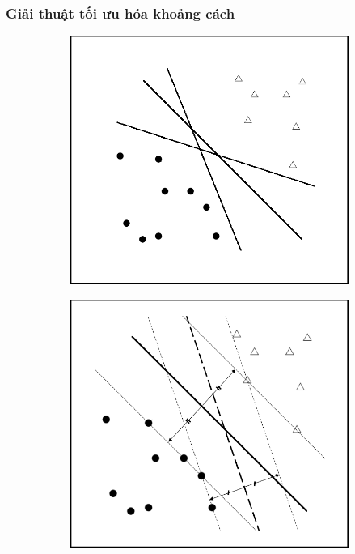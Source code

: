 \subsubsection*{Giải thuật tối ưu hóa khoảng cách}
\begin{figure}[h] \centering
    \begin{subfigure}[b]{0.325\textwidth}    \centering
        \includegraphics[width=\textwidth]{hinh/SVM2.png}
        \caption{ }
        \label{fig:svm1}
    \end{subfigure}
    \begin{subfigure}[b]{0.325\textwidth}    \centering
        \includegraphics[width=\textwidth]{hinh/SVM3.png}

\end{subfigure}
\end{figure}
